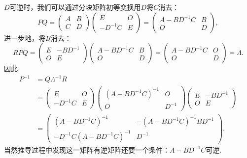 \begin{solution}
    $D$可逆时，我们可以通过分块矩阵初等变换用$D$将$C$消去：
    \[ PQ=\begin{pmatrix}
            A & B \\ C & D
        \end{pmatrix}\begin{pmatrix}
            E & O \\ -D^{-1}C & E
        \end{pmatrix}=\begin{pmatrix}
            A-BD^{-1}C & B \\ O & D
        \end{pmatrix},\]
    进一步地，将$B$消去：
    \[ RPQ=\begin{pmatrix}
            E & -BD^{-1} \\ O & E
        \end{pmatrix}\begin{pmatrix}
            A-BD^{-1}C & B \\ O & D
        \end{pmatrix}=\begin{pmatrix}
            A-BD^{-1}C & O \\ O & D
        \end{pmatrix}=\varLambda.\]
    因此
    \begin{align*}
        P^{-1}&=Q\varLambda^{-1}R \\
                &=\begin{pmatrix}
                E & O \\ -D^{-1}C & E
            \end{pmatrix}\begin{pmatrix}
                (A-BD^{-1}C)^{-1} & O \\ O & D^{-1}
            \end{pmatrix}\begin{pmatrix}
                E & -BD^{-1} \\ O & E
            \end{pmatrix} \\
                &=\begin{pmatrix}
                (A-BD^{-1}C)^{-1} & -(A-BD^{-1}C)^{-1}BD^{-1} \\ -D^{-1}C(A-BD^{-1}C)^{-1} & D^{-1}
            \end{pmatrix}.
    \end{align*}
    当然推导过程中发现这一矩阵有逆矩阵还要一个条件：$A-BD^{-1}C$可逆.
\end{solution}

